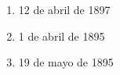 \documentclass[twocolumn]{article}
\begin{document}
\begin{enumerate}
  \begin{enumerate}
   
   \item 12 de abril de 1897
   
   \item 1 de abril de 1895
   
   \item 19 de mayo de 1895
   
  \end{enumerate}


\end{enumerate}


\end{document}
